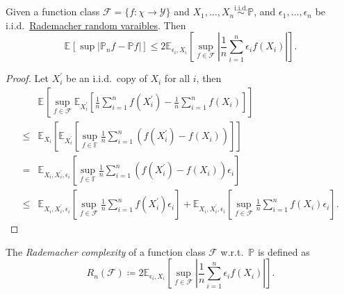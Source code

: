 \begin{lemma}[Symmetrization]\label{lma:symmetrization}
	Given a function class \(\mathscr{F} = \{ f\colon \chi \to \mathcal{Y} \} \) and \(X_1, \dots , X_n \overset{\text{i.i.d.} }{\sim } \mathbb{P} \), and \(\epsilon _1, \dots , \epsilon _n\) be i.i.d.\ \hyperref[eg:Rademacher-random-varaible]{Rademacher random varaibles}. Then
	\[
		\mathbb{E}_{}\left[\sup \left\vert \mathbb{P} _n f - \mathbb{P} f \right\vert  \right]
		\leq 2 \mathbb{E}_{\epsilon _i, X_i}\left[\sup _{f\in \mathscr{F} }\left\vert \frac{1}{n}\sum_{i=1}^{n} \epsilon _i f(X_i) \right\vert  \right] .
	\]
\end{lemma}
\begin{proof}
	Let \(X_i^{\prime} \) be an i.i.d.\ copy of \(X_i\) for all \(i\), then
	\[
		\begin{split}
			&\mathbb{E}_{}\left[\sup _{f\in \mathscr{F} } \mathbb{E}_{X_i^{\prime} }\left[ \frac{1}{n} \sum_{i=1}^{n} f(X_i^{\prime} ) - \frac{1}{n} \sum_{i=1}^{n} f(X_i)\right]  \right]\\
			\leq& \mathbb{E}_{X_i}\left[ \mathbb{E}_{X_i^{\prime} }\left[ \sup _{f\in \mathbb{F} } \frac{1}{n} \sum_{i=1}^{n} (f(X_i^{\prime} ) - f(X_i)) \right]  \right] \\
			=& \mathbb{E}_{X_i, X_i^{\prime} , \epsilon _i}\left[ \sup _{f\in \mathbb{F} } \frac{1}{n} \sum_{i=1}^{n} (f(X_i^{\prime} ) - f(X_i))\epsilon _i \right] \\
			\leq& \mathbb{E}_{X_i, X_i^{\prime} , \epsilon _i}\left[ \sup _{f\in \mathscr{F} } \frac{1}{n}\sum_{i=1}^{n} f(X_i^{\prime} ) \epsilon _i \right] + \mathbb{E}_{X_i, X_i^{\prime} , \epsilon _i}\left[ \sup _{f\in \mathscr{F} } \frac{1}{n}\sum_{i=1}^{n} f(X_i ) \epsilon _i \right].
		\end{split}
	\]
\end{proof}

\begin{definition}\label{def:Rademacher-complexity}
	The \emph{Rademacher complexity} of a function class \(\mathscr{F} \) w.r.t.\ \(\mathbb{P} \) is defined as
	\[
		R_n(\mathscr{F} ) \coloneqq 2 \mathbb{E}_{\epsilon _i, X_i}\left[\sup _{f\in \mathscr{F} }\left\vert \frac{1}{n}\sum_{i=1}^{n} \epsilon _i f(X_i) \right\vert  \right] .
	\]
\end{definition}

